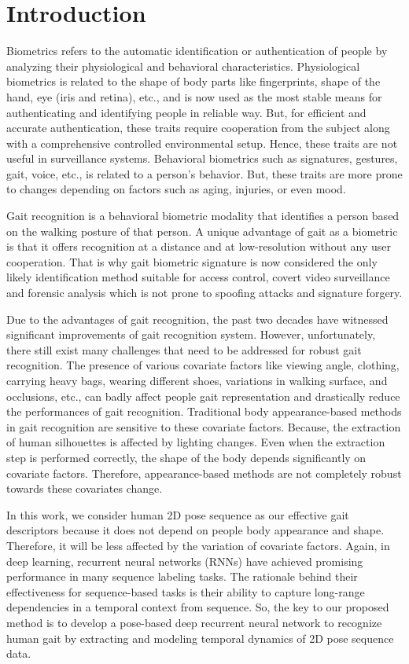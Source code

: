 \chapter{Introduction}\label{intro}
Biometrics refers to the automatic identification or authentication of people by analyzing their physiological and behavioral characteristics. Physiological biometrics is related to the shape of body parts like fingerprints, shape of the hand, eye (iris and retina), etc., and is now used as the most stable means for authenticating and identifying people in reliable way. But, for efficient and accurate authentication, these traits require cooperation from the subject along with a comprehensive controlled environmental setup. Hence, these traits are not useful in surveillance systems. Behavioral biometrics such as signatures, gestures, gait, voice, etc., is related to a person\rq s behavior. But, these traits are more prone to changes depending on factors such as aging, injuries, or even mood. 

Gait recognition is a behavioral biometric modality that identifies a person based on the walking posture of that person. A unique advantage of gait as a biometric is that it offers recognition at a distance and at low-resolution without any user cooperation. That is why gait biometric signature is now considered the only likely identification method suitable for access control, covert video surveillance and forensic analysis which is not prone to spoofing attacks and signature forgery.

Due to the advantages of gait recognition, the past two decades have witnessed significant improvements of gait recognition system. However, unfortunately, there still exist many challenges that need to be addressed for robust gait recognition. The presence of various covariate factors like viewing angle, clothing, carrying heavy bags, wearing different shoes, variations in walking surface, and occlusions, etc., can badly affect people gait representation and drastically reduce the performances of gait recognition. Traditional body appearance-based methods in gait recognition are sensitive to these covariate factors. Because, the extraction of human silhouettes is affected by lighting changes. Even when the extraction step is performed correctly, the shape of the body depends significantly on covariate factors. Therefore, appearance-based methods are not completely robust towards these covariates change.

In this work, we consider human 2D pose sequence as our effective gait descriptors because it does not depend on people body appearance and shape. Therefore, it will be less affected by the variation of covariate factors. Again, in deep learning, recurrent neural networks (RNNs) have achieved promising performance in many sequence labeling tasks. The rationale behind their effectiveness for sequence-based tasks is their ability to capture long-range dependencies in a temporal context from sequence. So, the key to our proposed method is to develop a pose-based deep recurrent neural network to recognize human gait by extracting and modeling temporal dynamics of 2D pose sequence data.

